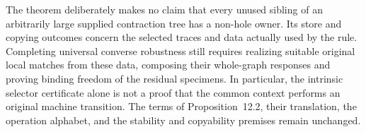 The theorem deliberately makes no claim that every unused sibling of an
arbitrarily large supplied contraction tree has a non-hole owner. Its store
and copying outcomes concern the selected traces and data actually used by
the rule. Completing universal converse robustness still requires realizing
suitable original local matches from these data, composing their whole-graph
responses and proving binding freedom of the residual specimens. In particular,
the intrinsic selector certificate alone is not a proof that the common
context performs an original machine transition. The terms of Proposition~12.2,
their translation, the operation alphabet, and the stability and copyability
premises remain unchanged.
